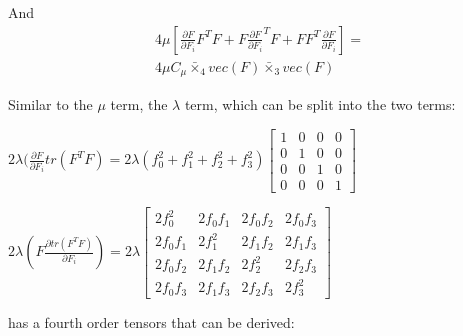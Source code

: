 \documentclass[twocolumn,10pt]{asme2ej}
\begin{document}
And
\begin{equation}
\begin{split}
4\mu[\frac{\partial F}{\partial F_i}F^TF + F\frac{\partial F}{\partial F_i}^TF + FF^T\frac{\partial F}{\partial F_i}] =
\\ 4\mu C_{\mu} \bar{\times}_4 vec(F) \bar{\times}_3 vec(F)
\end{split}
\end{equation}

Similar to the $\mu$ term, the $\lambda$ term, which can be split into the two terms:

\begin{center}
  $2\lambda (\frac{\partial F}{\partial F_i}tr(F^TF)  = 2\lambda(f_{0}^2 + f_{1}^2 + f_{2}^2  + f_{3}^2) \begin{bmatrix}
  1 & 0 & 0 & 0  \\
  0 & 1  & 0 & 0 \\
  0 & 0 & 1  & 0 \\
  0 & 0 & 0 & 1  \end{bmatrix}$

  \bigskip
  $2\lambda (F\frac{\partial tr(F^TF)}{\partial F_i})  = 2\lambda \begin{bmatrix}
  2f_{0}^2 & 2f_0f_1 & 2f_0f_2 & 2f_0f_3  \\
  2f_0f_1 & 2f_{1}^2 & 2f_1f_2 & 2f_1f_3 \\
  2f_0f_2 & 2f_1f_2 & 2f_{2}^2 & 2f_2f_3 \\
  2f_0f_3 & 2f_1f_3 & 2f_2f_3 & 2f_{3}^2  \end{bmatrix}$
\end{center}

has a fourth order tensors that can be derived:
\end{document}

